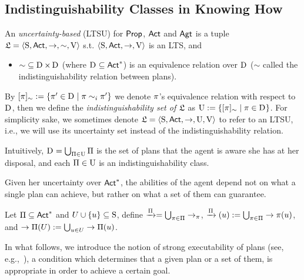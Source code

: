 \subsection{Indistinguishability Classes in Knowing How}

\begin{definition}\label{def:ults}
    An \emph{uncertainty-based \lts} (LTSU) for ${\rm \sf Prop}$, ${\rm \sf Act}$ and ${\rm \sf Agt}$ is a tuple     $\mathfrak{L}=\langle{\operatorname{S},{\rm \sf Act},\rightarrow,\sim,\operatorname{V}}\rangle$ s.t. $\langle{\operatorname{S},{\rm \sf Act},\rightarrow,\operatorname{V}}\rangle$ is an LTS, and 
        \begin{itemize}
            \item ${\sim}\subseteq \operatorname{D}_{}\times \operatorname{D}_{}$ (where $\operatorname{D}_{}\subseteq{\rm \sf Act}^*$) is an equivalence relation over $\operatorname{D}_{}$ ($\sim$ called the indistinguishability relation between plans). 
        \end{itemize}
        By $[\pi]_{\sim}:=\{{\pi' \in \operatorname{D}_{} \mid \pi \sim_i \pi'}\}$ we denote $\pi$'s equivalence relation with respect to $\operatorname{D}_{}$, then we define the \emph{indistinguishability set of $\mathfrak{L}$} as $\operatorname{U} := \{{[\pi]_{\sim} \mid \pi\in\operatorname{D}_{}}\}$. 
        For simplicity sake, we sometimes denote $\mathfrak{L}=\langle{\operatorname{S},{\rm \sf Act},\rightarrow,\operatorname{U},\operatorname{V}}\rangle$ to refer to an LTSU, i.e., we will use its uncertainty set instead of the indistinguishability relation.
    \end{definition}
    
    Intuitively, $\operatorname{D}_{} = \bigcup_{\Pi \in \operatorname{U}} \Pi$ is the set of plans that the  agent is aware she has at her disposal, and each $\Pi \in \operatorname{U}$ is an indistinguishability class. 
    
    Given her uncertainty over ${\rm \sf Act}^*$, the abilities of the agent depend not on what a single plan can achieve, but rather on what a set of them can guarantee.
    
    \medskip
    
    \begin{definition}
    Let $\Pi \subseteq {\rm \sf Act}^*$ and $U \cup \{{u}\} \subseteq \operatorname{S}$, define $\xrightarrow{\Pi} = \bigcup_{\pi \in \Pi} \rightarrow_{\pi}$, $\xrightarrow{\Pi}(u) := \bigcup_{\pi \in \Pi} \rightarrow{\pi}(u)$, and $\rightarrow{\Pi}(U) := \bigcup_{u \in U} \rightarrow{\Pi}(u)$.
    \end{definition}
    
    \medskip
    
    In what follows, we introduce the notion of strong executability of plans (see, e.g.,~\cite{Wang15lori,AFSVQ23}), a condition which determines that a given plan or a set of them, is appropriate in order to achieve a certain goal.
    
